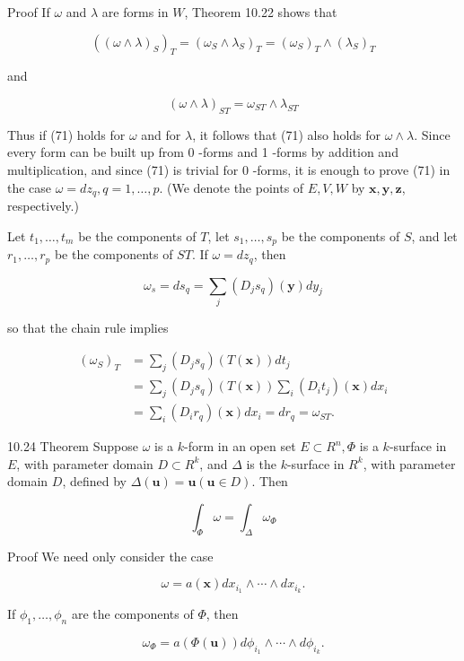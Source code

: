 \documentclass[10pt]{article}
\begin{document}
Proof If $\omega$ and $\lambda$ are forms in $W$, Theorem 10.22 shows that

$$
\left((\omega \wedge \lambda)_{S}\right)_{T}=\left(\omega_{S} \wedge \lambda_{S}\right)_{T}=\left(\omega_{S}\right)_{T} \wedge\left(\lambda_{S}\right)_{T}
$$

and

$$
(\omega \wedge \lambda)_{S T}=\omega_{S T} \wedge \lambda_{S T}
$$

Thus if (71) holds for $\omega$ and for $\lambda$, it follows that (71) also holds for $\omega \wedge \lambda$. Since every form can be built up from 0 -forms and 1 -forms by addition and multiplication, and since (71) is trivial for 0 -forms, it is enough to prove (71) in the case $\omega=d z_{q}, q=1, \ldots, p$. (We denote the points of $E, V, W$ by $\mathbf{x}, \mathbf{y}, \mathbf{z}$, respectively.)

Let $t_{1}, \ldots, t_{m}$ be the components of $T$, let $s_{1}, \ldots, s_{p}$ be the components of $S$, and let $r_{1}, \ldots, r_{p}$ be the components of $S T$. If $\omega=d z_{q}$, then

$$
\omega_{s}=d s_{q}=\sum_{j}\left(D_{j} s_{q}\right)(\mathbf{y}) d y_{j}
$$

so that the chain rule implies

$$
\begin{aligned}
\left(\omega_{S}\right)_{T} & =\sum_{j}\left(D_{j} s_{q}\right)(T(\mathbf{x})) d t_{j} \\
& =\sum_{j}\left(D_{j} s_{q}\right)(T(\mathbf{x})) \sum_{i}\left(D_{i} t_{j}\right)(\mathbf{x}) d x_{i} \\
& =\sum_{i}\left(D_{i} r_{q}\right)(\mathbf{x}) d x_{i}=d r_{q}=\omega_{S T} .
\end{aligned}
$$

10.24 Theorem Suppose $\omega$ is a $k$-form in an open set $E \subset R^{n}, \Phi$ is a $k$-surface in $E$, with parameter domain $D \subset R^{k}$, and $\Delta$ is the $k$-surface in $R^{k}$, with parameter domain $D$, defined by $\Delta(\mathbf{u})=\mathbf{u}(\mathbf{u} \in D)$. Then

$$
\int_{\Phi} \omega=\int_{\Delta} \omega_{\Phi}
$$

Proof We need only consider the case

$$
\omega=a(\mathbf{x}) d x_{i_{1}} \wedge \cdots \wedge d x_{i_{k}} .
$$

If $\phi_{1}, \ldots, \phi_{n}$ are the components of $\Phi$, then

$$
\omega_{\Phi}=a(\Phi(\mathbf{u})) d \phi_{i_{1}} \wedge \cdots \wedge d \phi_{i_{k}} .
$$
\end{document}
